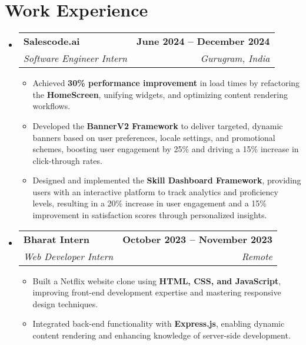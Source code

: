 \documentclass[letterpaper,11pt]{article}
\makeatletter
\newcommand{\resumeItem}[1]{
  \item\small{
    {#1 \vspace{0pt}}
  }
}
\newcommand{\resumeSubheading}[4]{
  \vspace{-2pt}\item
    \begin{tabular*}{1.0\textwidth}[t]{l@{\extracolsep{\fill}}r}
      \textbf{#1} & \textbf{\small #2} \\
      \textit{\small#3} & \textit{\small #4} \\
    \end{tabular*}\vspace{-7pt}
}
\newcommand{\resumeSubHeadingListStart}{\begin{itemize}[leftmargin=0.0in, label={}]}
\newcommand{\resumeSubHeadingListEnd}{\end{itemize}}\vspace{0pt}
\newcommand{\resumeItemListStart}{\begin{itemize}}
\newcommand{\resumeItemListEnd}{\end{itemize}\vspace{-5pt}}
\makeatother
\begin{document}
\section{Work Experience}
    \resumeSubHeadingListStart
                \resumeSubheading{Salescode.ai}{June 2024 -- December 2024}{Software Engineer Intern}{Gurugram, India} 
                \resumeItemListStart
                    \resumeItem{Achieved \textbf{30\% performance improvement} in load times by refactoring the \textbf{HomeScreen}, unifying widgets, and optimizing content rendering workflows.}
                    \resumeItem{Developed the \textbf{BannerV2 Framework} to deliver targeted, dynamic banners based on user preferences, locale settings, and promotional schemes, boosting user engagement by 25\% and driving a 15\% increase in click-through rates.}
                    \resumeItem{Designed and implemented the \textbf{Skill Dashboard Framework}, providing users with an interactive platform to track analytics and proficiency levels, resulting in a 20\% increase in user engagement and a 15\% improvement in satisfaction scores through personalized insights.}
                    \resumeItemListEnd
            \resumeSubheading{Bharat Intern}{October 2023 -- November 2023}{Web Developer Intern}{Remote}
                \resumeItemListStart
                    \resumeItem{Built a Netflix website clone using \textbf{HTML, CSS, and JavaScript}, improving front-end development expertise and mastering responsive design techniques.}
                    \resumeItem{Integrated back-end functionality with \textbf{Express.js}, enabling dynamic content rendering and enhancing knowledge of server-side development.}
                    \resumeItemListEnd
    \resumeSubHeadingListEnd
    \vspace{-12pt}

\end{document}
